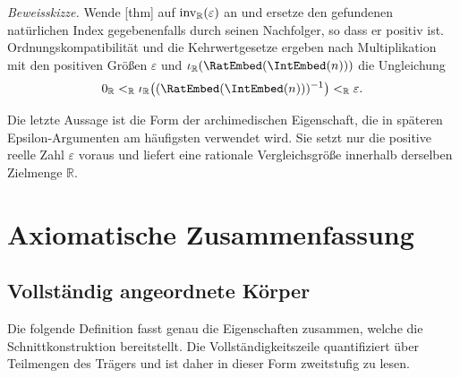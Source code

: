 \documentclass[main.tex]{subfiles}
\begin{document}
\emph{Beweisskizze.}
Wende [thm] auf
\(\operatorname{inv}_{\mathbb R}\!\left(\varepsilon\right)\) an und ersetze den gefundenen natürlichen Index
gegebenenfalls durch seinen Nachfolger, so dass er positiv ist.
Ordnungskompatibilität und
die Kehrwertgesetze ergeben nach Multiplikation mit den positiven Größen
\(\varepsilon\) und
\(\RealEmb(\RatEmbed(\IntEmbed(n)))\) die Ungleichung
\[
  \RealZero\RealLt
  \RealEmb\bigl((\RatEmbed(\IntEmbed(n)))^{-1}\bigr)
  \RealLt\varepsilon .
\]

Die letzte Aussage ist die Form der archimedischen Eigenschaft, die in
späteren Epsilon-Argumenten am häufigsten verwendet wird. Sie setzt nur die
positive reelle Zahl \(\varepsilon\) voraus und liefert eine rationale
Vergleichsgröße innerhalb derselben Zielmenge \(\mathbb R\).

\chapter{Axiomatische Zusammenfassung}

\section{Vollständig angeordnete Körper}

Die folgende Definition fasst genau die Eigenschaften zusammen, welche die
Schnittkonstruktion bereitstellt. Die Vollständigkeitszeile quantifiziert über
Teilmengen des Trägers und ist daher in dieser Form zweitstufig zu lesen.
\end{document}
